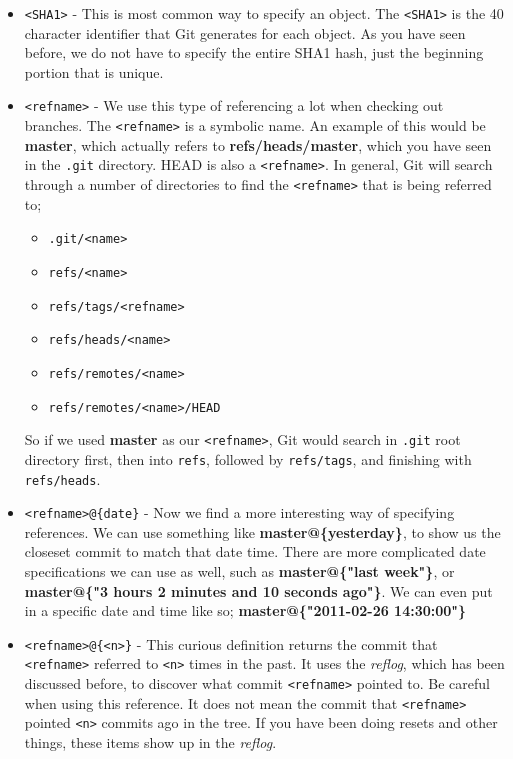 \begin{itemize}
\item{}\texttt{<SHA1>} - This is most common way to specify an object.
The \texttt{<SHA1>} is the 40 character identifier that Git generates for each object.
As you have seen before, we do not have to specify the entire SHA1 hash, just the beginning portion that is unique.

\item{}\texttt{<refname>} - We use this type of referencing a lot when checking out branches.  
The \texttt{<refname>} is a symbolic name.
An example of this would be \textbf{master}, which actually refers to \textbf{refs/heads/master}, which you have seen in the \texttt{.git} directory.
HEAD is also a \texttt{<refname>}.  In general, Git will search through a number of directories to find the \texttt{<refname>} that is being referred to;
\begin{itemize}
\item \texttt{.git/<name>}
\item \texttt{refs/<name>}
\item \texttt{refs/tags/<refname>}
\item \texttt{refs/heads/<name>}
\item \texttt{refs/remotes/<name>}
\item \texttt{refs/remotes/<name>/HEAD}
\end{itemize}
So if we used \textbf{master} as our \texttt{<refname>}, Git would search in \texttt{.git} root directory first,
then into \texttt{refs}, followed by \texttt{refs/tags}, and finishing with \texttt{refs/heads}.

\item{}\texttt{<refname>@\{date\}} - Now we find a more interesting way of specifying references.
We can use something like \textbf{master@\{yesterday\}}, to show us the closeset commit to match that date time.  
There are more complicated date specifications we can use as well, such as \textbf{master@\{"last week"\}}, or \textbf{master@\{"3 hours 2 minutes and 10 seconds ago"\}}.
We can even put in a specific date and time like so; \textbf{master@\{"2011-02-26 14:30:00"\}}

\item\texttt{<refname>@\{<n>\}} - This curious definition returns the commit that \texttt{<refname>} referred to \texttt{<n>} times in the past.
It uses the \emph{reflog}, which has been discussed before, to discover what commit \texttt{<refname>} pointed to.
Be careful when using this reference.  It does not mean the commit that \texttt{<refname>} pointed \texttt{<n>} commits ago in the tree.
If you have been doing resets and other things, these items show up in the \emph{reflog}.


\end{itemize}
